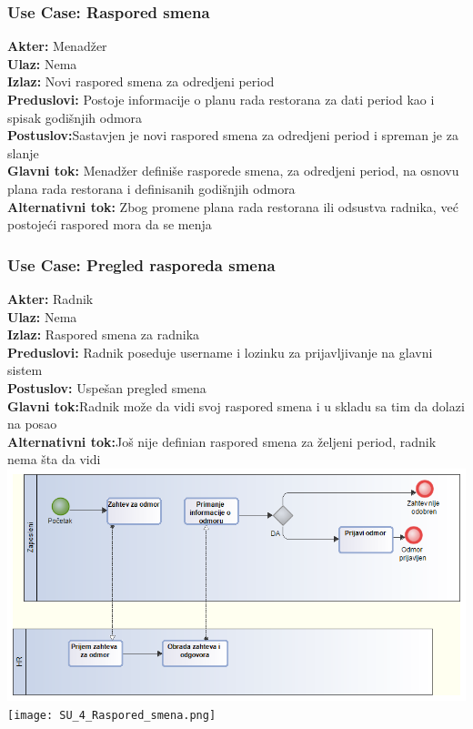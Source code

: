 \documentclass{article}
\begin{document}
\subsubsection{\textbf{Use Case}: Raspored smena}
\textbf{Akter:} Menadžer\\
\textbf{Ulaz:} Nema\\
\textbf{Izlaz:} Novi raspored smena za odredjeni period\\
\textbf{Preduslovi:} Postoje informacije o planu rada restorana za dati period kao i spisak godišnjih odmora\\
\textbf{Postuslov:}Sastavjen je novi raspored smena za odredjeni period i spreman je za slanje\\
\textbf{Glavni tok:} Menadžer definiše rasporede smena, za odredjeni period, na osnovu plana rada restorana i definisanih godišnjih odmora\\
\textbf{Alternativni tok:} Zbog promene plana rada restorana ili odsustva radnika, već postojeći raspored mora da se menja\\

\subsubsection{\textbf{Use Case}: Pregled rasporeda smena}
\textbf{Akter:} Radnik\\
\textbf{Ulaz:} Nema\\
\textbf{Izlaz:} Raspored smena za radnika\\
\textbf{Preduslovi:} Radnik poseduje username i lozinku za prijavljivanje na glavni sistem\\
\textbf{Postuslov:} Uspešan pregled smena\\
\textbf{Glavni tok:}Radnik može da vidi svoj raspored smena i u skladu sa tim da dolazi na posao\\
\textbf{Alternativni tok:}Još nije definian raspored smena za željeni period, radnik nema šta da vidi\\
\includegraphics[width=\textwidth]{SU_4_Odmor.png}\\
\texttt{[image: SU\_4\_Raspored\_smena.png]}\\
\end{document}
